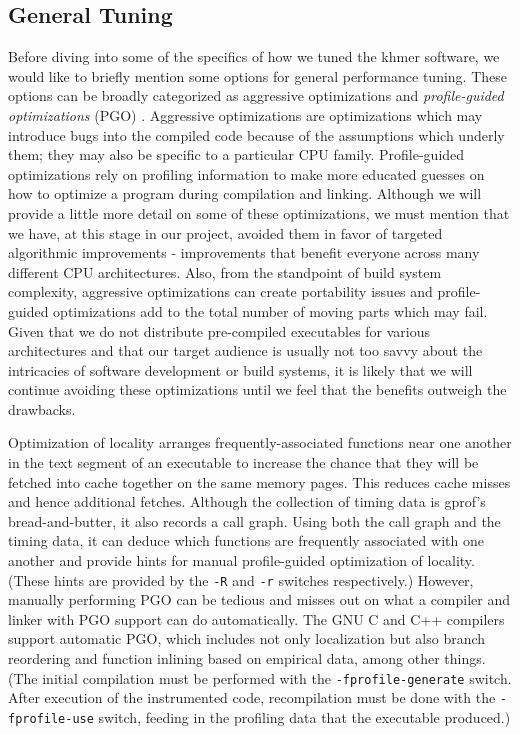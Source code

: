\documentclass{article}
\begin{document}
\subsection{General Tuning}

Before diving into some of the specifics of how we tuned the khmer software, we would like to briefly mention some options for general performance tuning. These options can be broadly categorized as aggressive optimizations and \textit{profile-guided optimizations} (PGO) \citep{web:PGO}. Aggressive optimizations are optimizations which may introduce bugs into the compiled code because of the assumptions which underly them; they may also be specific to a particular CPU family. Profile-guided optimizations rely on profiling information to make more educated guesses on how to optimize a program during compilation and linking. Although we will provide a little more detail on some of these optimizations, we must mention that we have, at this stage in our project, avoided them in favor of targeted algorithmic improvements - improvements that benefit everyone across many different CPU architectures. Also, from the standpoint of build system complexity, aggressive optimizations can create portability issues and profile-guided optimizations add to the total number of moving parts which may fail. Given that we do not distribute pre-compiled executables for various architectures and that our target audience is usually not too savvy about the intricacies of software development or build systems, it is likely that we will continue avoiding these optimizations until we feel that the benefits outweigh the drawbacks.

Optimization of locality arranges frequently-associated functions near one another in the text segment of an executable to increase the chance that they will be fetched into cache together on the same memory pages. This reduces cache misses and hence additional fetches. Although the collection of timing data is gprof's bread-and-butter, it also records a call graph. Using both the call graph and the timing data, it can deduce which functions are frequently associated with one another and provide hints for manual profile-guided optimization of locality. (These hints are provided by the \texttt{-R} and \texttt{-r} switches respectively.) However, manually performing PGO can be tedious and misses out on what a compiler and linker with PGO support can do automatically. The GNU C and C++ compilers support automatic PGO, which includes not only localization but also branch reordering and function inlining based on empirical data, among other things. (The initial compilation must be performed with the \texttt{-fprofile-generate} switch. After execution of the instrumented code, recompilation must be done with the \texttt{-fprofile-use} switch, feeding in the profiling data that the executable produced.)
\end{document}
